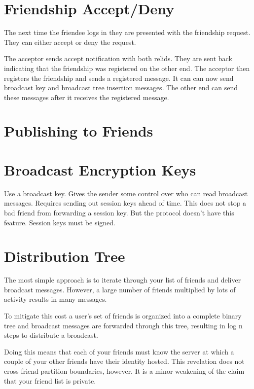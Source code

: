 \documentclass[letterpaper,11pt,oneside]{article}
\begin{document}
\section{Friendship Accept/Deny}

The next time the friendee logs in they are presented with the friendship
request. They can either accept or deny the request. 

The acceptor sends accept notification with both relids. They are sent back
indicating that the friendship was registered on the other end. The acceptor
then registers the friendship and sends a registered message. It can can now
send broadcast key and broadcast tree insertion messages. The other end can
send these messages after it receives the registered message.

\section{Publishing to Friends}

\section{Broadcast Encryption Keys}

Use a broadcast key. Gives the sender some control over who can read broadcast
messages. Requires sending out session keys ahead of time. This does not stop a
bad friend from forwarding a session key. But the protocol doesn't have this
feature. Session keys must be signed.

\section{Distribution Tree}

The most simple approach is to iterate through your list of friends and deliver
broadcast messages. However, a large number of friends multiplied by lots of
activity results in many messages.  

To mitigate this cost a user's set of friends is organized into a complete
binary tree and broadcast messages are forwarded through this tree, resulting
in log n steps to distribute a broadcast.

Doing this means that each of your friends must know the server at which a
couple of your other friends have their identity hosted. This revelation does
not cross friend-partition boundaries, however. It is a minor weakening of the
claim that your friend list is private.
\end{document}
